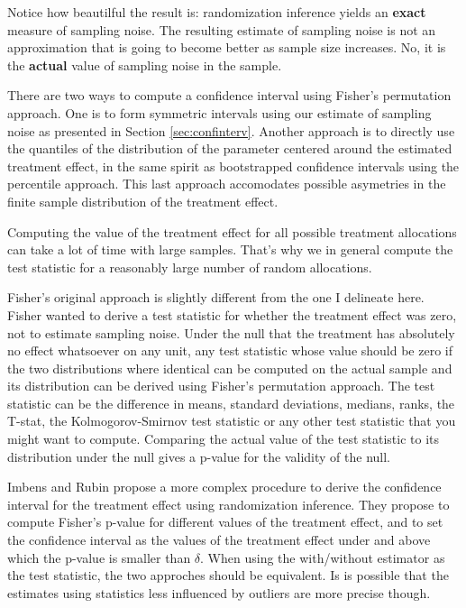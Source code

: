 \documentclass[]{book}
\theoremstyle{definition}
\theoremstyle{definition}
\theoremstyle{definition}
\theoremstyle{remark}
\let\BeginKnitrBlock\begin \let\EndKnitrBlock\end
\begin{document}
Notice how beautilful the result is: randomization inference yields an \textbf{exact} measure of sampling noise.
The resulting estimate of sampling noise is not an approximation that is going to become better as sample size increases.
No, it is the \textbf{actual} value of sampling noise in the sample.

There are two ways to compute a confidence interval using Fisher's permutation approach.
One is to form symmetric intervals using our estimate of sampling noise as presented in Section \ref{sec:confinterv}.
Another approach is to directly use the quantiles of the distribution of the parameter centered around the estimated treatment effect, in the same spirit as bootstrapped confidence intervals using the percentile approach.
This last approach accomodates possible asymetries in the finite sample distribution of the treatment effect.

Computing the value of the treatment effect for all possible treatment allocations can take a lot of time with large samples.
That's why we in general compute the test statistic for a reasonably large number of random allocations.

\BeginKnitrBlock{remark}
\iffalse{} {Remark. } \fi{}Fisher's original approach is slightly different from the one I delineate here.
Fisher wanted to derive a test statistic for whether the treatment effect was zero, not to estimate sampling noise.
Under the null that the treatment has absolutely no effect whatsoever on any unit, any test statistic whose value should be zero if the two distributions where identical can be computed on the actual sample and its distribution can be derived using Fisher's permutation approach.
The test statistic can be the difference in means, standard deviations, medians, ranks, the T-stat, the Kolmogorov-Smirnov test statistic or any other test statistic that you might want to compute.
Comparing the actual value of the test statistic to its distribution under the null gives a p-value for the validity of the null.
\EndKnitrBlock{remark}

\BeginKnitrBlock{remark}
\iffalse{} {Remark. } \fi{}Imbens and Rubin propose a more complex procedure to derive the confidence interval for the treatment effect using randomization inference.
They propose to compute Fisher's p-value for different values of the treatment effect, and to set the confidence interval as the values of the treatment effect under and above which the p-value is smaller than \(\delta\).
When using the with/without estimator as the test statistic, the two approches should be equivalent.
Is is possible that the estimates using statistics less influenced by outliers are more precise though.
\EndKnitrBlock{remark}
\end{document}
